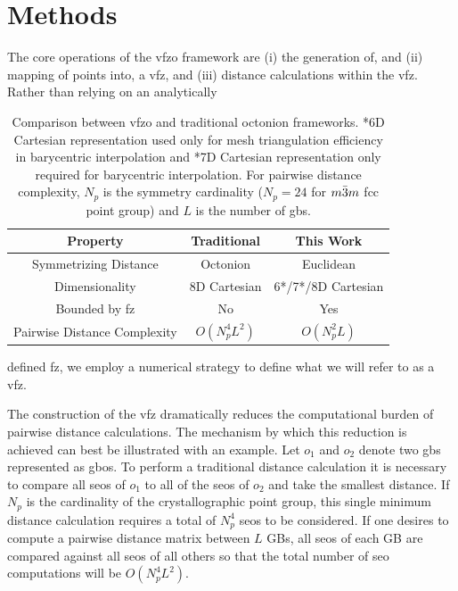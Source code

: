 \documentclass[final,twocolumn,12pt]{elsarticle}
\begin{document}
\section{Methods} \label{sec:methods}

The core operations of the \gls{vfzo} framework are (i) the generation of, and (ii) mapping of points into, a \gls{vfz}, and (iii) distance calculations within the \gls{vfz}. Rather than relying on an analytically
\begin{table}
\caption{Comparison between \acrlong{vfzo} and traditional octonion frameworks. *6D Cartesian representation used only for mesh triangulation efficiency in barycentric interpolation and *7D Cartesian representation only required for barycentric interpolation. For pairwise distance complexity, $N_p$ is the symmetry cardinality ($N_p=24$ for $m\Bar{3}m$ \gls{fcc} point group) and $L$ is the number of \glspl{gb}.}
\centering
\begin{tabular}{ccc}
\toprule
Property & Traditional & This Work \\
\midrule
Symmetrizing Distance & Octonion & Euclidean \\
Dimensionality & 8D Cartesian & 6*/7*/8D Cartesian \\
Bounded by \Gls{fz} & No & Yes \\
Pairwise Distance Complexity & $O(N_p^4L^2)$ & $O(N_p^2L)$ \\
\bottomrule
\end{tabular}
\label{tab:closed-mesh-comparison}
\end{table} 
defined \gls{fz}, we employ a numerical strategy to define what we will refer to as a \gls{vfz}.

The construction of the \gls{vfz} dramatically reduces the computational burden of pairwise distance calculations. The mechanism by which this reduction is achieved can best be illustrated with an example. Let $o_1$ and $o_2$ denote two \glspl{gb} represented as \glspl{gbo}. 
To perform a traditional distance calculation it is necessary to compare all \glspl{seo} of $o_1$ to all of the \glspl{seo} of $o_2$ and take the smallest distance. If $N_p$ is the cardinality of the crystallographic point group, this single minimum distance calculation requires a total of $N_p^4$ \glspl{seo} to be considered. If one desires to compute a pairwise distance matrix between $L$ GBs, all \glspl{seo} of each GB are compared against all \glspl{seo} of all others so that the total number of \gls{seo} computations will be $O(N_p^4L^2)$.
\end{document}
